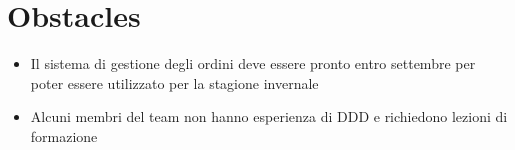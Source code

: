 \section{Obstacles}
\begin{itemize}
  \item Il sistema di gestione degli ordini deve essere pronto entro settembre per poter essere utilizzato per la stagione invernale
  \item Alcuni membri del team non hanno esperienza di DDD e richiedono lezioni di formazione
\end{itemize}

